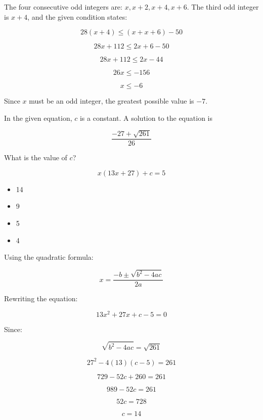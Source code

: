 \documentclass{article}
\begin{document}
\begin{tcolorbox}[colback=green!5!white, colframe=green!75!black, title=Solution]
The four consecutive odd integers are: \( x, x+2, x+4, x+6 \).  
The third odd integer is \( x+4 \), and the given condition states:

\[
28(x+4) \leq (x + x + 6) - 50
\]

\[
28x + 112 \leq 2x + 6 - 50
\]

\[
28x + 112 \leq 2x - 44
\]

\[
26x \leq -156
\]

\[
x \leq -6
\]

Since \( x \) must be an odd integer, the greatest possible value is \( -7 \).
\end{tcolorbox}

\vspace{1cm}

\begin{tcolorbox}[colback=blue!10, colframe=blue!50!black, title=Question 12]
In the given equation, \( c \) is a constant. A solution to the equation is 

\[
\frac{-27 + \sqrt{261}}{26}
\]

What is the value of \( c \)?

\[
x(13x + 27) + c = 5
\]

\begin{itemize}
    \item[A.] 14 
    \item[B.] 9
    \item[C.] 5
    \item[D.] 4
\end{itemize}
\end{tcolorbox}

\begin{tcolorbox}[colback=green!5!white, colframe=green!75!black, title=Solution]
Using the quadratic formula:

\[
x = \frac{-b \pm \sqrt{b^2 - 4ac}}{2a}
\]

Rewriting the equation:

\[
13x^2 + 27x + c - 5 = 0
\]

Since:

\[
\sqrt{b^2 - 4ac} = \sqrt{261}
\]

\[
27^2 - 4(13)(c - 5) = 261
\]

\[
729 - 52c + 260 = 261
\]

\[
989 - 52c = 261
\]

\[
52c = 728
\]

\[
c = 14
\]
\end{tcolorbox}
\end{document}
